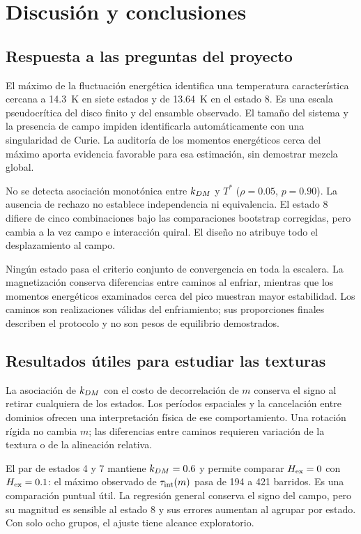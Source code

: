\section{Discusión y conclusiones}

\subsection{Respuesta a las preguntas del proyecto}

El máximo de la fluctuación energética identifica una temperatura característica cercana a 14.3~K en siete estados y de 13.64~K en el estado 8. Es una escala pseudocrítica del disco finito y del ensamble observado. El tamaño del sistema y la presencia de campo impiden identificarla automáticamente con una singularidad de Curie. La auditoría de los momentos energéticos cerca del máximo aporta evidencia favorable para esa estimación, sin demostrar mezcla global.

No se detecta asociación monotónica entre $k_{DM}$ y $T^*$ ($\rho=0.05$, $p=0.90$). La ausencia de rechazo no establece independencia ni equivalencia. El estado 8 difiere de cinco combinaciones bajo las comparaciones bootstrap corregidas, pero cambia a la vez campo e interacción quiral. El diseño no atribuye todo el desplazamiento al campo.

Ningún estado pasa el criterio conjunto de convergencia en toda la escalera. La magnetización conserva diferencias entre caminos al enfriar, mientras que los momentos energéticos examinados cerca del pico muestran mayor estabilidad. Los caminos son realizaciones válidas del enfriamiento; sus proporciones finales describen el protocolo y no son pesos de equilibrio demostrados.

\subsection{Resultados útiles para estudiar las texturas}

La asociación de $k_{DM}$ con el costo de decorrelación de $m$ conserva el signo al retirar cualquiera de los estados. Los períodos espaciales y la cancelación entre dominios ofrecen una interpretación física de ese comportamiento. Una rotación rígida no cambia $m$; las diferencias entre caminos requieren variación de la textura o de la alineación relativa.

El par de estados 4 y 7 mantiene $k_{DM}=0.6$ y permite comparar $H_{\mathrm{ex}}=0$ con $H_{\mathrm{ex}}=0.1$: el máximo observado de $\tau_{\mathrm{int}}(m)$ pasa de 194 a 421 barridos. Es una comparación puntual útil. La regresión general conserva el signo del campo, pero su magnitud es sensible al estado 8 y sus errores aumentan al agrupar por estado. Con solo ocho grupos, el ajuste tiene alcance exploratorio.

